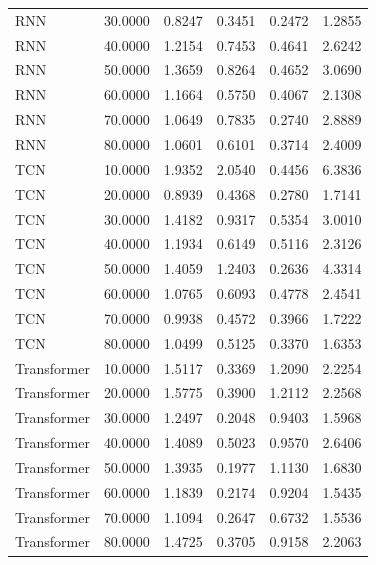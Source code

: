 \begin{tabular}{lrrrrr}
RNN & 30.0000 & 0.8247 & 0.3451 & 0.2472 & 1.2855 \\
RNN & 40.0000 & 1.2154 & 0.7453 & 0.4641 & 2.6242 \\
RNN & 50.0000 & 1.3659 & 0.8264 & 0.4652 & 3.0690 \\
RNN & 60.0000 & 1.1664 & 0.5750 & 0.4067 & 2.1308 \\
RNN & 70.0000 & 1.0649 & 0.7835 & 0.2740 & 2.8889 \\
RNN & 80.0000 & 1.0601 & 0.6101 & 0.3714 & 2.4009 \\
TCN & 10.0000 & 1.9352 & 2.0540 & 0.4456 & 6.3836 \\
TCN & 20.0000 & 0.8939 & 0.4368 & 0.2780 & 1.7141 \\
TCN & 30.0000 & 1.4182 & 0.9317 & 0.5354 & 3.0010 \\
TCN & 40.0000 & 1.1934 & 0.6149 & 0.5116 & 2.3126 \\
TCN & 50.0000 & 1.4059 & 1.2403 & 0.2636 & 4.3314 \\
TCN & 60.0000 & 1.0765 & 0.6093 & 0.4778 & 2.4541 \\
TCN & 70.0000 & 0.9938 & 0.4572 & 0.3966 & 1.7222 \\
TCN & 80.0000 & 1.0499 & 0.5125 & 0.3370 & 1.6353 \\
Transformer & 10.0000 & 1.5117 & 0.3369 & 1.2090 & 2.2254 \\
Transformer & 20.0000 & 1.5775 & 0.3900 & 1.2112 & 2.2568 \\
Transformer & 30.0000 & 1.2497 & 0.2048 & 0.9403 & 1.5968 \\
Transformer & 40.0000 & 1.4089 & 0.5023 & 0.9570 & 2.6406 \\
Transformer & 50.0000 & 1.3935 & 0.1977 & 1.1130 & 1.6830 \\
Transformer & 60.0000 & 1.1839 & 0.2174 & 0.9204 & 1.5435 \\
Transformer & 70.0000 & 1.1094 & 0.2647 & 0.6732 & 1.5536 \\
Transformer & 80.0000 & 1.4725 & 0.3705 & 0.9158 & 2.2063 \\
\bottomrule
\end{tabular}
